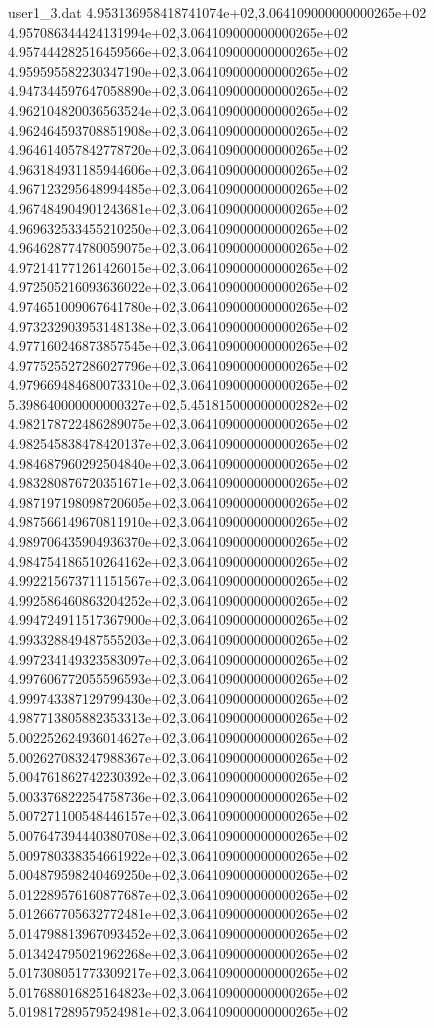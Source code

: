 \begin{filecontents}{user1_3.dat}
4.953136958418741074e+02,3.064109000000000265e+02
4.957086344424131994e+02,3.064109000000000265e+02
4.957444282516459566e+02,3.064109000000000265e+02
4.959595582230347190e+02,3.064109000000000265e+02
4.947344597647058890e+02,3.064109000000000265e+02
4.962104820036563524e+02,3.064109000000000265e+02
4.962464593708851908e+02,3.064109000000000265e+02
4.964614057842778720e+02,3.064109000000000265e+02
4.963184931185944606e+02,3.064109000000000265e+02
4.967123295648994485e+02,3.064109000000000265e+02
4.967484904901243681e+02,3.064109000000000265e+02
4.969632533455210250e+02,3.064109000000000265e+02
4.964628774780059075e+02,3.064109000000000265e+02
4.972141771261426015e+02,3.064109000000000265e+02
4.972505216093636022e+02,3.064109000000000265e+02
4.974651009067641780e+02,3.064109000000000265e+02
4.973232903953148138e+02,3.064109000000000265e+02
4.977160246873857545e+02,3.064109000000000265e+02
4.977525527286027796e+02,3.064109000000000265e+02
4.979669484680073310e+02,3.064109000000000265e+02
5.398640000000000327e+02,5.451815000000000282e+02
4.982178722486289075e+02,3.064109000000000265e+02
4.982545838478420137e+02,3.064109000000000265e+02
4.984687960292504840e+02,3.064109000000000265e+02
4.983280876720351671e+02,3.064109000000000265e+02
4.987197198098720605e+02,3.064109000000000265e+02
4.987566149670811910e+02,3.064109000000000265e+02
4.989706435904936370e+02,3.064109000000000265e+02
4.984754186510264162e+02,3.064109000000000265e+02
4.992215673711151567e+02,3.064109000000000265e+02
4.992586460863204252e+02,3.064109000000000265e+02
4.994724911517367900e+02,3.064109000000000265e+02
4.993328849487555203e+02,3.064109000000000265e+02
4.997234149323583097e+02,3.064109000000000265e+02
4.997606772055596593e+02,3.064109000000000265e+02
4.999743387129799430e+02,3.064109000000000265e+02
4.987713805882353313e+02,3.064109000000000265e+02
5.002252624936014627e+02,3.064109000000000265e+02
5.002627083247988367e+02,3.064109000000000265e+02
5.004761862742230392e+02,3.064109000000000265e+02
5.003376822254758736e+02,3.064109000000000265e+02
5.007271100548446157e+02,3.064109000000000265e+02
5.007647394440380708e+02,3.064109000000000265e+02
5.009780338354661922e+02,3.064109000000000265e+02
5.004879598240469250e+02,3.064109000000000265e+02
5.012289576160877687e+02,3.064109000000000265e+02
5.012667705632772481e+02,3.064109000000000265e+02
5.014798813967093452e+02,3.064109000000000265e+02
5.013424795021962268e+02,3.064109000000000265e+02
5.017308051773309217e+02,3.064109000000000265e+02
5.017688016825164823e+02,3.064109000000000265e+02
5.019817289579524981e+02,3.064109000000000265e+02

\end{filecontents}
